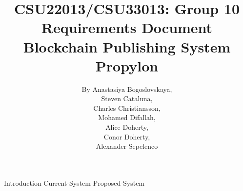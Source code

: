 \documentclass{article}
\title{
	{CSU22013/CSU33013: Group 10}\\
	{Requirements Document}\\
	{Blockchain Publishing System}\\
	{\large Propylon}
}
\author{
	{By Anastasiya Bogoslovskaya,}\\
	{Steven Cataluna,} \\
	{Charles Christiansson,} \\
    {Mohamed Difallah,} \\
	{Alice Doherty,} \\
	{Conor Doherty,} \\
	{Alexander Sepelenco}
}
\date{} %
\begin{document}

\maketitle %
\tableofcontents %

{Introduction} 
{Current-System}
{Proposed-System}
\end{document}
